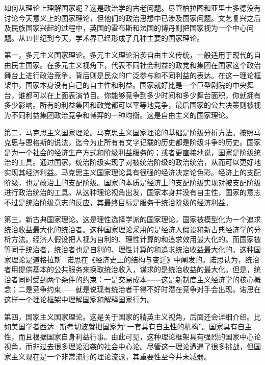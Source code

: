 
如何从理论上理解国家呢？这是政治学的古老问题。尽管柏拉图和亚里士多德没有讨论今天意义上的国家理论，但他们的政治思想中已涉及国家问题。文艺复兴之后及民族国家兴起的过程中，英国的霍布斯和法国的博丹则把国家视为一个中心问题。从19世纪到今天，学术界已经形成了几种主要的国家理论。

第一，多元主义国家理论。多元主义理论沿袭自由主义传统，一般适用于现代的自由民主国家。在多元主义视角下，代表不同社会利益的政党和集团在国家这个政治舞台上进行政治竞争，背后则是民众的广泛参与和不同利益的表达。在这一理论框架中，国家本身没有自己的自主性和利益。国家就好比是一个巨型剧院的中央舞台，谁都可以在上面表演节目。你能够竞争到多少时间和多少舞台面积，你就拥有多少影响。所有的利益集团和政党都可以平等地竞争，最后国家的公共决策则被视为不同利益集团政治竞争和博弈的一种均衡。这是自由主义的国家理论。

第二，马克思主义国家理论。马克思主义国家理论的基础是阶级分析方法。按照马克思与恩格斯的说法，迄今为止所有有文字记载的历史都是阶级斗争的历史。国家是为一个社会的经济生产方式和阶级利益服务的；或者更直接地说，国家是阶级统治的工具。通过国家，统治阶级实现了对被统治阶级的政治统治，从而可以更好地实现其经济利益。马克思主义国家理论具有很强的经济决定论色彩。经济上的支配阶级，也是政治上的支配阶级。国家的本质是经济上的支配阶级实现对被支配阶级进行政治统治的工具。从这种理论视角出发，国家本身并没有自主性，国家的意志不过是统治阶级意志的反应，其最终目标是服务于统治阶级的经济利益。

第三，新古典国家理论。这是理性选择学派的国家理论，国家被模型化为一个追求统治收益最大化的统治者。这种国家理论采用的是经济人假设和新古典经济学的分析方法。经济人假设把人视为自利的、理性计算的和追求效用最大化的。而国家被等同于统治者，统治者也是自利的、理性计算的和追求统治收益最大化的。这种国家理论是道格拉斯·诺思在《经济史上的结构与变迁》中阐发的。诺思认为，统治者用提供基本的公共服务来换取统治收入，谋求的是统治收益的最大化。但是，统治者同时受到两个条件的约束：一是交易成本——这是新制度主义经济学的核心概念；二是竞争约束——就是说现有统治者干得不好时潜在竞争对手会出现。诺思在这样一个理论框架中理解国家和解释国家行为。

第四，国家主义国家理论。这是关于国家的精英主义视角，后面还会详细介绍。比如美国学者西达·斯考切波就把国家为“一套具有自主性的机构”。国家具有自主性，而且根据国家自身利益行事。由此可见，这种理论框架具有强烈的国家中心论视角，而非过去很多理论沿袭的社会中心论。尽管这一理论遭遇了很多挑战，但国家主义现在是一个非常流行的理论流派，其重要性至今并未减弱。

